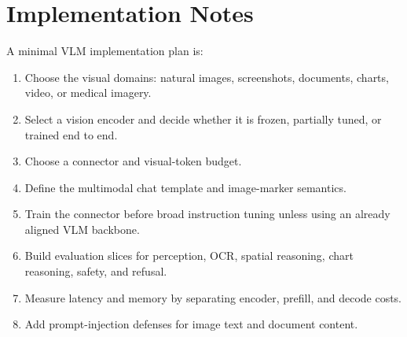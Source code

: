 \section{Implementation Notes}
A minimal VLM implementation plan is:
\begin{enumerate}
    \item Choose the visual domains: natural images, screenshots, documents, charts, video, or medical imagery.
    \item Select a vision encoder and decide whether it is frozen, partially tuned, or trained end to end.
    \item Choose a connector and visual-token budget.
    \item Define the multimodal chat template and image-marker semantics.
    \item Train the connector before broad instruction tuning unless using an already aligned VLM backbone.
    \item Build evaluation slices for perception, OCR, spatial reasoning, chart reasoning, safety, and refusal.
    \item Measure latency and memory by separating encoder, prefill, and decode costs.
    \item Add prompt-injection defenses for image text and document content.
\end{enumerate}

